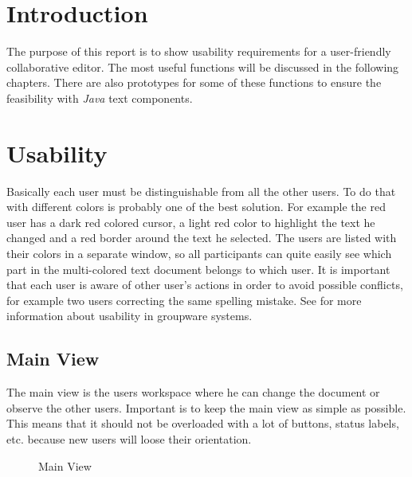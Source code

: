\documentclass[11pt,a4paper]{article}
\begin{document}
\setlength{\parindent}{0pt}

\newtheorem{defn}{Definition}




\newpage

\tableofcontents
\newpage
\listoftables
\listoffigures
\newpage



\section{Introduction}
The purpose of this report is to show usability requirements for a user-friendly collaborative editor. The most useful functions will be discussed in the following chapters. There are also prototypes for some of these functions to ensure the feasibility with \emph{Java} text components.

\section{Usability}
Basically each user must be distinguishable from all the other users. To do that with different colors is probably one of the best solution. For example the red user has a dark red colored cursor, a light red color to highlight the text he changed and a red border around the text he selected. The users are listed with their colors in a separate window, so all participants can quite easily see which part in the multi-colored text document belongs to which user. It is important that each user is aware of other user's actions in order to avoid possible conflicts, for example two users correcting the same spelling mistake. See \cite{usability} for more information about usability in groupware systems.

\subsection{Main View}
The main view is the users workspace where he can change the document or observe the other users. Important is to keep the main view as simple as possible. This means that it should not be overloaded with a lot of buttons, status labels, etc. because new users will loose their orientation.
\begin{figure}[H]
\centering
{}
\caption{Main View}
\end{figure}
\end{document}
